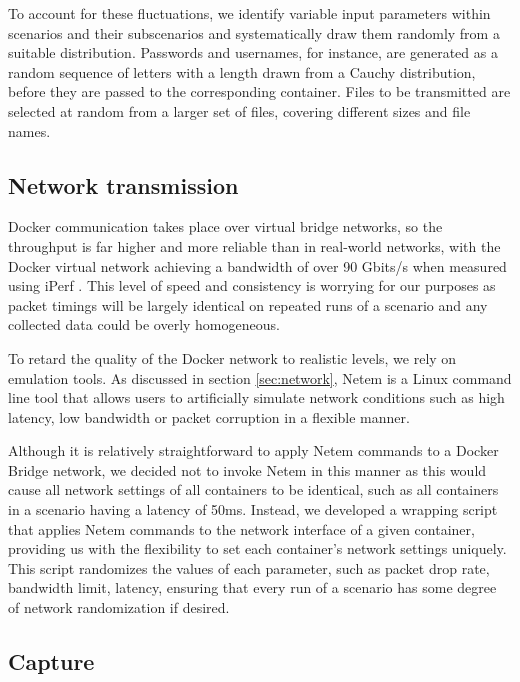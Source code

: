 To account for these fluctuations, we identify variable input parameters within scenarios and their subscenarios and systematically draw them randomly from a suitable distribution. Passwords and usernames, for instance, are generated as a random sequence of letters with a length drawn from a Cauchy distribution, before they are passed to the corresponding container. Files to be transmitted are selected at random from a larger set of files, covering different sizes and file names.


\subsection{Network transmission}\label{Sec:Netrand}


 Docker communication takes place over virtual bridge networks, so the throughput is far higher and more reliable than in real-world networks, with the Docker virtual network achieving a bandwidth of over 90 Gbits/s when measured using iPerf \cite{iperf}. This level of speed and consistency is worrying for our purposes as packet timings will be largely identical on repeated runs of a scenario and any collected data could be overly homogeneous.

To retard the quality of the Docker network to realistic levels, we rely on emulation tools. As discussed in section \ref{sec:network}, Netem is a Linux command line tool that allows users to artificially simulate network conditions such as high latency, low bandwidth or packet corruption in a flexible manner.

Although it is relatively straightforward to apply Netem commands to a Docker Bridge network, we decided not to invoke Netem in this manner as this would cause all network settings of all containers to be identical, such as all containers in a scenario having a latency of 50ms.  Instead, we developed a wrapping script that applies Netem commands to the network interface of a given container, providing us with the flexibility to set each container's network settings uniquely. This script randomizes the values of each parameter, such as packet drop rate, bandwidth limit, latency, ensuring that every run of a scenario has some degree of network randomization if desired.

\subsection{Capture}


